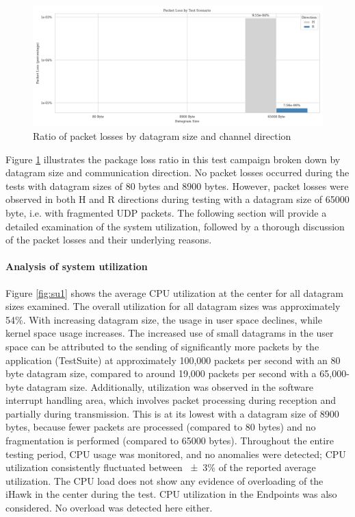 \documentclass[11pt]{article}
\begin{document}
\begin{figure}[h]
	\includegraphics[width=\textwidth]{fig2.png}
	\centering
	\caption{Ratio of packet losses by datagram size and channel direction}
    \label{fig:fig2}
\end{figure}

Figure \ref{fig:fig2} illustrates the package loss ratio in this test campaign broken down by datagram size and communication direction. No packet losses occurred during the tests with datagram sizes of 80 bytes and 8900 bytes. However, packet losses were observed in both H and R directions during testing with a datagram size of 65000 byte, i.e. with fragmented UDP packets. The following section will provide a detailed examination of the system utilization, followed by a thorough discussion of the packet losses and their underlying reasons.

\paragraph*{Analysis of system utilization}

Figure \ref{fig:su1} shows the average CPU utilization at the center for all datagram sizes examined. The overall utilization for all datagram sizes was approximately 54\%. With increasing datagram size, the usage in user space declines, while kernel space usage increases. The increased use of small datagrams in the user space can be attributed to the sending of significantly more packets by the application (TestSuite) at approximately 100,000 packets per second with an 80 byte datagram size, compared to around 19,000 packets per second with a 65,000-byte datagram size. Additionally, utilization was observed in the software interrupt handling area, which involves packet processing during reception and partially during transmission. This is at its lowest with a datagram size of 8900 bytes, because fewer packets are processed (compared to 80 bytes) and no fragmentation is performed (compared to 65000 bytes).  Throughout the entire testing period, CPU usage was monitored, and no anomalies were detected; CPU utilization consistently fluctuated between \num{\pm 3}\% of the reported average utilization. The CPU load does not show any evidence of overloading of the iHawk in the center during the test. CPU utilization in the Endpoints was also considered. No overload was detected here either.
\end{document}
